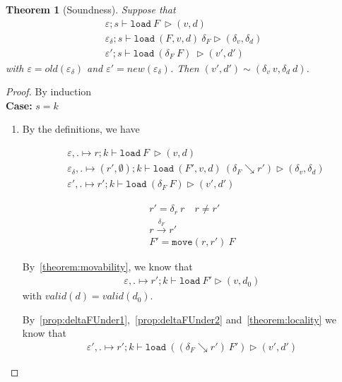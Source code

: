 \documentclass[10pt,twoside,a4paper]{article}
\theoremstyle{theorem}
\newtheorem{theorem}{Theorem}[section]
\theoremstyle{lemma}
\theoremstyle{property}
\begin{document}
\begin{theorem}[Soundness]
	Suppose that
	\begin{align*}
		\varepsilon ; s \vdash \mathtt{load}~ F~ \rhd (v,d)\\
		\varepsilon_\delta ; s \vdash \mathtt{load}~ (F,v,d)~ \delta_F \rhd (\delta_v,\delta_d)\\
		\varepsilon' ; s \vdash \mathtt{load}~ (\delta_F~F)~ \rhd (v',d')
	\end{align*}
	with $\varepsilon = old(\varepsilon_\delta)$ and $\varepsilon' = new(\varepsilon_\delta)$.
	Then $(v',d') \sim (\delta_v ~ v,\delta_d ~ d)$.
\end{theorem}
\begin{proof}By induction\\
	\textbf{Case: } $s = k$\\
	\begin{enumerate}
		\item
		By the definitions, we have
		
	\begin{minipage}[b]{0.45\textwidth}
		\begin{align*}
			&\varepsilon , . \mapsto r ; k \vdash \mathtt{load}~ F~ \rhd (v,d) \\
			&\varepsilon_\delta , . \mapsto (r',\emptyset) ; k \vdash \mathtt{load}~ (F',v,d)~ (\delta_F \searrow r') \rhd (\delta_v,\delta_d) \\
			&\varepsilon' , . \mapsto r' ; k \vdash \mathtt{load}~ (\delta_F ~ F) \rhd (v',d')
		\end{align*}
	\end{minipage}
	\begin{minipage}[b]{0.45\textwidth}
		\begin{align*}
			r' = \delta_r ~ r \quad r \neq r'\\
			r \xrightarrow{\delta_F} r'\\
			F' = \mathtt{move}(r,r')~F
		\end{align*}
	\end{minipage}
	
	By~\ref{theorem:movability}, we know that
	\begin{align*}
		\varepsilon , . \mapsto r' ; k \vdash \mathtt{load}~ F' \rhd (v,d_0)
	\end{align*}
	with $valid(d) = valid(d_0)$.
	
	By~\ref{prop:deltaFUnder1},~\ref{prop:deltaFUnder2} and~\ref{theorem:locality} we know that
	\begin{align*}
		\varepsilon' , . \mapsto r' ; k \vdash \mathtt{load}~ ((\delta_F \searrow r') ~ F') \rhd (v',d')
	\end{align*}
	

\end{enumerate}
\end{proof}
\end{document}
